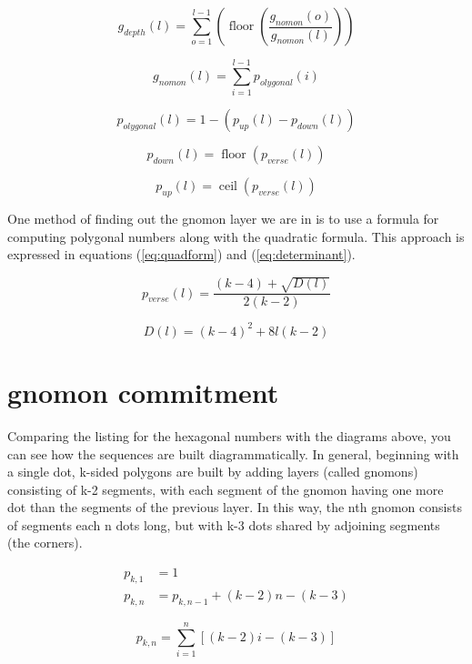 \documentclass{article}
\begin{document}
\begin{equation}
    g_{depth}\left(l\right)=\sum_{o=1}^{l-1}\left(\operatorname{floor}\left(\frac{g_{nomon}\left(o\right)}{g_{nomon}\left(l\right)}\right)\right)
\end{equation}

\begin{equation}
    g_{nomon}\left(l\right)=\sum_{i=1}^{l-1}p_{olygonal}\left(i\right)
\end{equation}

\begin{equation}
    p_{olygonal}\left(l\right)=1-\left(p_{up}\left(l\right)-p_{down}\left(l\right)\right)
\end{equation}

\begin{equation}
p_{down}\left(l\right)=\operatorname{floor}\left(p_{verse}\left(l\right)\right)
\end{equation}

\begin{equation}
p_{up}\left(l\right)=\operatorname{ceil}\left(p_{verse}\left(l\right)\right)
\end{equation}

One method of finding out the gnomon layer we are in is to use a formula for computing polygonal numbers along with the quadratic formula. This approach is expressed in equations (\ref{eq:quadform}) and (\ref{eq:determinant}).

\begin{equation}
    p_{verse}\left(l\right)=\frac{\left(k-4\right)+\sqrt{D\left(l\right)}}{2\left(k-2\right)}
     \label{eq:quadform}
\end{equation}

\begin{equation}
    D\left(l\right)=\left(k-4\right)^{2}+8l\left(k-2\right)
    \label{eq:determinant}
\end{equation}

\section{gnomon commitment}

Comparing the listing for the hexagonal numbers with the diagrams above, you can see how the sequences are built diagrammatically. In general, beginning with a single dot, k-sided polygons are built by adding layers (called gnomons) consisting of k-2 segments, with each segment of the gnomon having one more dot than the segments of the previous layer. In this way, the nth gnomon consists of segments each n dots long, but with k-3 dots shared by adjoining segments (the corners).

\begin{align}
    p_{k, 1} &= 1 \\
    p_{k,n} &= p_{k,n-1} + (k-2)n - (k-3)
\end{align}

\begin{equation}
    p_{k,n} = \sum^{n}_{i=1}\left[(k-2)i-(k-3)\right] 
\end{equation}
\end{document}

